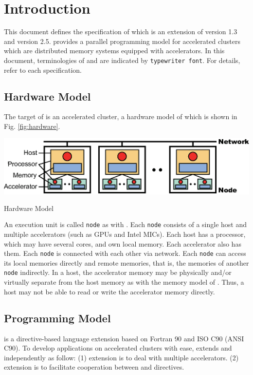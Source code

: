 \chapter{Introduction}\label{chap:intro}
\setcounter{page}{1}
This document defines the specification of {\XACC} which is an extension of {\XMP} version 1.3\cite{xmp} and {\OACC} version 2.5\cite{openacc}.
{\XACC} provides a parallel programming model for accelerated clusters
which are distributed memory systems equipped with accelerators.
In this document,
terminologies of {\XMP} and {\OACC} are indicated by {\tt typewriter font}.
For details, refer to each specification\cite{xmp,openacc}.

\section{Hardware Model}
The target of {\XACC} is an accelerated cluster,
a hardware model of which is shown in Fig. \ref{fig:hardware}.

\begin{myfigure}
  \includegraphics[scale=0.9,clip]{figs/hardware.eps}
  \caption{Hardware Model}\label{fig:hardware}
\end{myfigure}

An execution unit is called {\tt node} as with {\XMP}.
Each {\tt node} consists of a single host and multiple accelerators (such as GPUs and Intel MICs).
Each host has a processor, which may have several cores, and own local memory.
Each accelerator also has them.
Each {\tt node} is connected with each other via network.
Each {\tt node} can access its local memories directly and remote memories,
that is, the memories of another {\tt node} indirectly.
In a host,
the accelerator memory may be physically and/or virtually separate from the host memory as with the memory model of {\OACC}.
Thus,
a host may not be able to read or write the accelerator memory directly.

\section{Programming Model}
{\XACC} is a directive-based language extension based on Fortran 90 and ISO C90 (ANSI C90).
To develop applications on accelerated clusters with ease,
{\XACC} extends {\OACC} and {\XACC} independently as follow:
(1) {\OACC} extension is to deal with multiple accelerators.
(2) {\XMP} extension is to facilitate cooperation between {\XMP} and {\OACC} directives.

